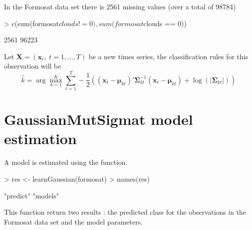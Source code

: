 \documentclass[shortnames,nojss,article]{jss}
\newcommand{\bmu}{\boldsymbol{\mu}}
\newcommand{\bSigma}{\boldsymbol{\Sigma}}
\begin{document}
In the Formosat data set there is 2561 missing values (over a total of 98784)
\begin{Schunk}
\begin{Sinput}
> c(sum(formosat$clouds != 0),sum(formosat$clouds == 0))
\end{Sinput}
\begin{Soutput}
[1]  2561 96223
\end{Soutput}
\end{Schunk}

Let $\mathbf{X}=(\mathbf{x}_t,\; t=1,\ldots,T)$ be a new times series, the classification rules for this
observation will be
$$
\hat{k} = \arg\max_{k=1}^K \sum_{t=1}^T -\frac{1}{2}
\left(
(\mathbf{x}_t - \bmu_{kt})' \bSigma_{kt}^{-1}(\mathbf{x}_{t} - \bmu_{kt}) + \log(|\bSigma_{kt}|)
\right)
$$

\section{GaussianMutSigmat model estimation}

A  model is estimated using the 
function.

\begin{Schunk}
\begin{Sinput}
> res <- learnGaussian(formosat)
> names(res)
\end{Sinput}
\begin{Soutput}
[1] "predict" "models" 
\end{Soutput}
\end{Schunk}

This function return two results : the predicted class for the observations in
the Formosat data set and the model parameters.
\end{document}
